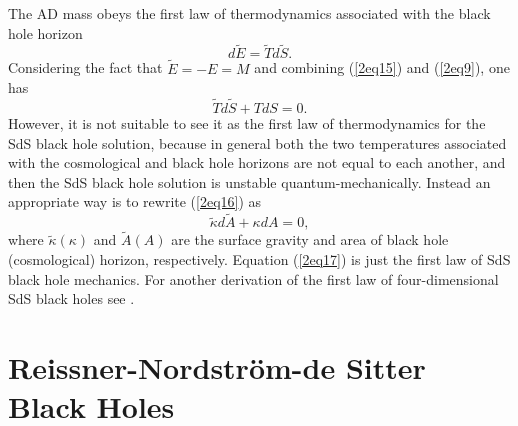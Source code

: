 \documentclass[a4paper,12pt]{article}
\newcommand{\sect}[1]{\setcounter{equation}{0}\section{#1}}
\begin{document}
The AD mass obeys the first law of thermodynamics associated with the black hole horizon
\begin{equation}
\label{2eq15}
d\tilde E=\tilde Td\tilde S.
\end{equation}
Considering the fact that $\tilde E =-E =M$ and combining (\ref{2eq15}) and (\ref{2eq9}),
one has
\begin{equation}
\label{2eq16}
\tilde Td\tilde S +TdS=0.
\end{equation}
However, it is not suitable to see it as the first law 
of thermodynamics for the SdS black hole solution, because in general both the two temperatures
associated with the cosmological and black hole horizons are not equal to each another, and
then the SdS black hole solution is unstable quantum-mechanically. Instead an appropriate
way is to rewrite (\ref{2eq16}) as
\begin{equation}
\label{2eq17}
\tilde \kappa d\tilde A+\kappa dA=0,
\end{equation} 
where $\tilde \kappa (\kappa)$ and $\tilde A (A)$ are the surface gravity and  area
of black hole (cosmological) horizon, respectively. Equation (\ref{2eq17}) is just the first
law of SdS black hole mechanics.  For another derivation of the first law of four-dimensional
SdS black holes see \cite{GH}.   




\sect{Reissner-Nordstr\"om-de Sitter Black Holes }
\end{document}
